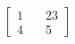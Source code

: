 \documentclass[preview]{standalone}
\begin{document}
\begin{align*}
\begin{bmatrix} 1 & \quad 23 \\ 4 & \quad 5 \end{bmatrix}
\end{align*}
\end{document}
